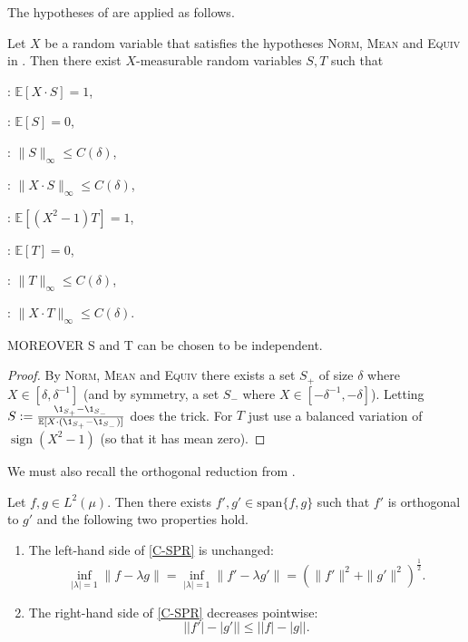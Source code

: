 \documentclass{inprogress}
\newcommand{\sign}{\operatorname{sign}}
\newcommand{\Hyp}[1]{\item[\textsc{#1}]\label{hyp:#1}\!\!\!\textsc{:}}
\newcommand{\hyp}[1]{\textsc{#1}}
\begin{document}
The hypotheses of  are applied as follows.
\begin{lemma}\label{lem:trunc}
    Let $X$ be a random variable that satisfies the hypotheses \hyp{Norm}, \hyp{Mean} and \hyp{Equiv} in . Then there exist $X$-measurable random variables $S,T$ such that

    \begin{minipage}{.49\textwidth}
    \begin{hypotheses}
        \Hyp{ReprS} $\mathbb E[X\cdot S] = 1$,
        \Hyp{MeanS} $\mathbb E[S] = 0$,
        \Hyp{BoundS} $\|S\|_\infty \le C(\delta)$,
        \Hyp{SuppS} $\|X\cdot S\|_\infty \le C(\delta)$,
    \end{hypotheses}
    \end{minipage}
    \begin{minipage}{.49\textwidth}
    \begin{hypotheses}
        \Hyp{ReprT} $\mathbb E[(X^2-1)T] = 1$,
        \Hyp{MeanT} $\mathbb E[T] = 0$,
        \Hyp{BoundT} $\|T\|_\infty \le C(\delta)$,
        \color{red}
        \Hyp{SuppT} $\|X\cdot T\|_\infty \le C(\delta)$.
        \color{black}
    \end{hypotheses}
    \end{minipage}
MOREOVER S and T can be chosen to be independent.
\end{lemma}
\begin{proof}

By \hyp{Norm}, \hyp{Mean} and \hyp{Equiv} there exists a set $S_+$ of size $\delta$ where $X \in [\delta, \delta^{-1}]$ (and by symmetry, a set $S_{-}$ where $X \in [ -\delta^{-1},-\delta]$). Letting $S:= \frac{\1_{S_+}-\1_{S_-}}{\mathbb E[X\cdot (\1_{S_+}-\1_{S_-})]}$ does the trick. For $T$ just use a balanced variation of $\sign(X^2-1)$ (so that it has mean zero).
\end{proof}
We must also recall the orthogonal reduction from \cite{FOTP}.
\begin{theorem}\label{ortho red}
    Let $f,g\in L^2(\mu)$. Then there exists $f',g'\in \text{span}\{f,g\}$ such that $f'$ is orthogonal to $g'$ and the following two properties hold.
    \begin{enumerate}
        \item The left-hand side of \eqref{C-SPR} is unchanged: $$\inf_{|\lambda|=1}\|f-\lambda g\|=\inf_{|\lambda|=1}\|f'-\lambda g'\|= (\|f'\|^2+\|g'\|^2)^\frac{1}{2}.$$
        \item The right-hand side of \eqref{C-SPR} decreases pointwise:
        $$\left| |f'|-|g'|\right|\leq \left| |f|-|g|\right|.$$
    \end{enumerate}
\end{theorem}
\end{document}
